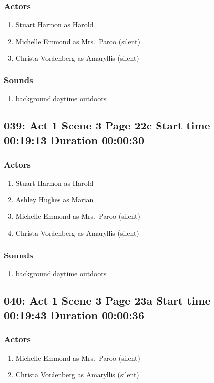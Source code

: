\subsubsection{Actors}
\begin{enumerate}
\item Stuart Harmon as Harold
\item Michelle Emmond as Mrs.~Paroo (silent)
\item Christa Vordenberg as Amaryllis (silent)
\end{enumerate}

\subsubsection{Sounds}
\begin{enumerate}
\item background daytime outdoors
\end{enumerate}
\subsection{039: Act 1 Scene 3 Page 22c Start time 00:19:13 Duration 00:00:30}

\subsubsection{Actors}
\begin{enumerate}
\item Stuart Harmon as Harold
\item Ashley Hughes as Marian
\item Michelle Emmond as Mrs.~Paroo (silent)
\item Christa Vordenberg as Amaryllis (silent)
\end{enumerate}

\subsubsection{Sounds}
\begin{enumerate}
\item background daytime outdoors
\end{enumerate}
\subsection{040: Act 1 Scene 3 Page 23a Start time 00:19:43 Duration 00:00:36}

\subsubsection{Actors}
\begin{enumerate}
\item Michelle Emmond as Mrs.~Paroo (silent)
\item Christa Vordenberg as Amaryllis (silent)
\end{enumerate}

